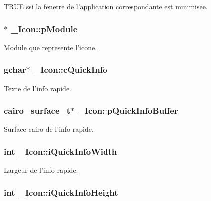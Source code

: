 TRUE ssi la fenetre de l'application correspondante est minimisee. 

\subsubsection{$\ast$ {\bf \_\-Icon::pModule}}\label{struct__Icon_3e869dde23dbc5a378b089546b7f69ee}


Module que represente l'icone. 

\subsubsection{\setlength{\rightskip}{0pt plus 5cm}gchar$\ast$ {\bf \_\-Icon::cQuickInfo}}\label{struct__Icon_a9d8cbea9ad2bdb074a968c0d6759246}


Texte de l'info rapide. 

\subsubsection{\setlength{\rightskip}{0pt plus 5cm}cairo\_\-surface\_\-t$\ast$ {\bf \_\-Icon::pQuickInfoBuffer}}\label{struct__Icon_d76fc0ce7debba080e598955f87f5ce4}


Surface cairo de l'info rapide. 

\subsubsection{\setlength{\rightskip}{0pt plus 5cm}int {\bf \_\-Icon::iQuickInfoWidth}}\label{struct__Icon_455e501ac7cbec2e9f7b88f8bb064438}


Largeur de l'info rapide. 

\subsubsection{\setlength{\rightskip}{0pt plus 5cm}int {\bf \_\-Icon::iQuickInfoHeight}}\label{struct__Icon_766df2d95a65730626349bdb5901962f}


